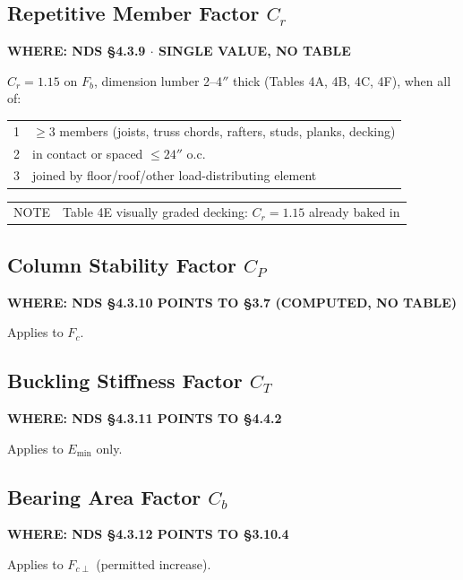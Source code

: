 \documentclass[10pt]{article}
\begin{document}
\subsection{Repetitive Member Factor $C_r$}

{\ttfamily\footnotesize\bfseries WHERE: NDS \S 4.3.9 $\cdot$ SINGLE VALUE, NO TABLE}

\medskip
$C_r = 1.15$ on $F_b$, dimension lumber 2--4$''$ thick (Tables 4A, 4B, 4C, 4F), when all of:

{\ttfamily\footnotesize
\begin{tabular}{@{}ll@{}}
1 & $\ge 3$ members (joists, truss chords, rafters, studs, planks, decking) \\
2 & in contact or spaced $\le 24''$ o.c. \\
3 & joined by floor/roof/other load-distributing element \\
\end{tabular}}

\smallskip
{\ttfamily\footnotesize
\begin{tabular}{@{}ll@{}}
NOTE & Table 4E visually graded decking: $C_r = 1.15$ already baked in \\
\end{tabular}}

\subsection{Column Stability Factor $C_P$}

{\ttfamily\footnotesize\bfseries WHERE: NDS \S 4.3.10 POINTS TO \S 3.7 (COMPUTED, NO TABLE)}

\medskip
Applies to $F_c$.

\subsection{Buckling Stiffness Factor $C_T$}

{\ttfamily\footnotesize\bfseries WHERE: NDS \S 4.3.11 POINTS TO \S 4.4.2}

\medskip
Applies to $E_{\min}$ only.

\subsection{Bearing Area Factor $C_b$}

{\ttfamily\footnotesize\bfseries WHERE: NDS \S 4.3.12 POINTS TO \S 3.10.4}

\medskip
Applies to $F_{c\perp}$ (permitted increase).
\end{document}
